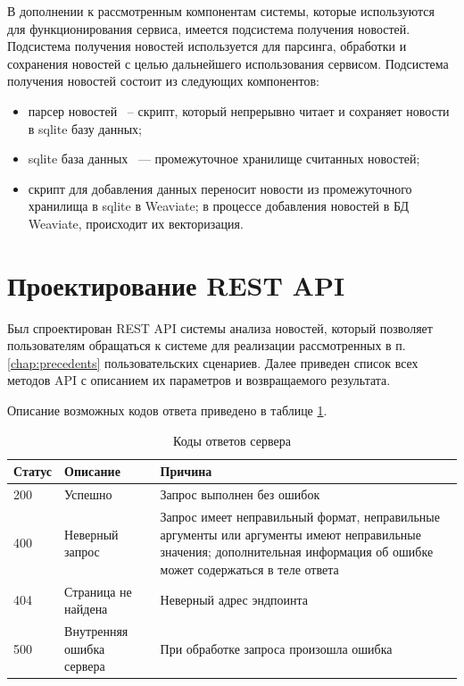 В дополнении к рассмотренным компонентам системы, которые используются для функционирования сервиса, имеется подсистема получения новостей. Подсистема получения новостей используется для парсинга, обработки и сохранения новостей с целью дальнейшего использования сервисом. Подсистема получения новостей состоит из следующих компонентов:
\begin{itemize}
    \item парсер новостей ~-- скрипт, который непрерывно читает и сохраняет новости в sqlite базу данных;
    \item sqlite база данных ~--- промежуточное хранилище считанных новостей;
    \item скрипт для добавления данных переносит новости из промежуточного хранилища в sqlite в Weaviate; в процессе добавления новостей в БД Weaviate, происходит их векторизация.
\end{itemize}

\section{Проектирование REST API}

Был спроектирован REST API системы анализа новостей, который позволяет пользователям обращаться к системе для реализации рассмотренных в п. \ref{chap:precedents} пользовательских сценариев. Далее приведен список всех методов API с описанием их параметров и возвращаемого результата.

Описание возможных кодов ответа приведено в таблице \ref{tab:status-codes}.

\begin{table}[ht]
    \caption{Коды ответов сервера}
    \label{tab:status-codes}
    \begin{tabularx}{\textwidth}{|l|l|X|}
        \hline
        Статус & Описание & Причина \\
        \hline
        200 & Успешно & Запрос выполнен без ошибок \\
        \hline
        400 & Неверный запрос & Запрос имеет неправильный формат, неправильные аргументы или аргументы имеют неправильные значения; дополнительная информация об ошибке может содержаться в теле ответа \\
        \hline
        404 & Страница не найдена & Неверный адрес эндпоинта \\
        \hline
        500 & Внутренняя ошибка сервера & При обработке запроса произошла ошибка \\
        \hline
    \end{tabularx}
\end{table}


